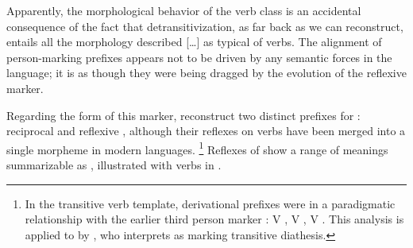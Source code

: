 \begin{quotebox}{\parencite[226]{meira2000split}}
	Apparently, the morphological behavior of the  verb class is an accidental consequence of the fact that detransitivization, as far back as we can reconstruct, entails all the morphology described […] as typical of  verbs. The alignment of person-marking prefixes appears not to be driven by any semantic forces in the language; it is as though they were being dragged by the evolution of the reflexive marker.
\end{quotebox}

Regarding the form of this marker, \textcite[505--512]{meira2010origin} reconstruct two distinct prefixes for \PC: reciprocal  and reflexive , although their reflexes on verbs have been merged into a single morpheme in modern languages.%
\footnote{In the \PC transitive verb template, derivational prefixes were in a paradigmatic relationship with the earlier third person marker :
V , V , V .
This analysis is applied to \trio by \textcite[268--269]{triocarlin2004}, who interprets  as marking transitive diathesis.}
Reflexes of \detrz show a range of meanings summarizable as , illustrated with \trio {} verbs in .

